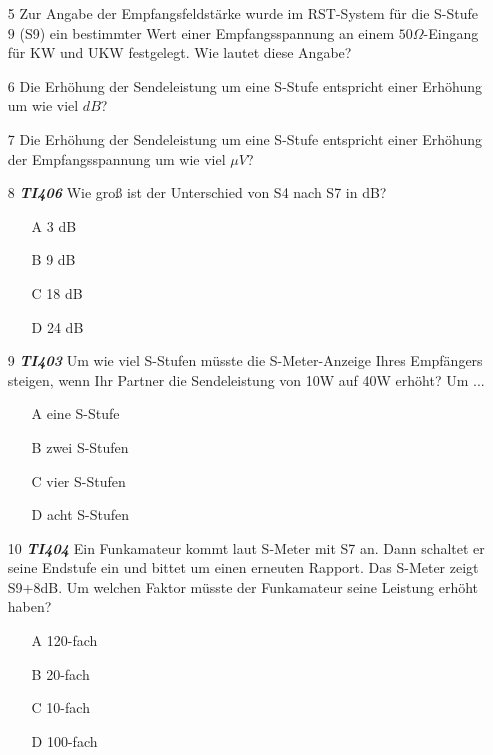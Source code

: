\begin{enumerate} 
\itemsep1pt\parskip0pt
\item[5] Zur Angabe der Empfangsfeldstärke wurde im RST-System für die S-Stufe $9$ (S9) ein bestimmter Wert einer Empfangsspannung an einem $50\Omega$-Eingang für KW und UKW festgelegt. Wie lautet diese Angabe?
\item[6] Die Erhöhung der Sendeleistung um eine S-Stufe entspricht einer Erhöhung um wie viel $dB$?
\item[7] Die Erhöhung der Sendeleistung um eine S-Stufe entspricht einer Erhöhung der Empfangsspannung um wie viel $\mu V$? 
\item[8] \emph{\textbf{TI406}} Wie groß ist der Unterschied von S4 nach S7 in dB?
	\begin{enumerate}
	\itemsep1pt\parskip0pt
		\item[A] 3 dB
		\item[B] 9 dB
		\item[C] 18 dB
		\item[D] 24 dB
	\end{enumerate}
\item[9] \emph{\textbf{TI403}} Um wie viel S-Stufen müsste die S-Meter-Anzeige Ihres Empfängers steigen, wenn Ihr Partner die Sendeleistung von 10W auf 40W erhöht? Um ...
	\begin{enumerate}
	\itemsep1pt\parskip0pt
		\item[A] eine S-Stufe
		\item[B] zwei S-Stufen
		\item[C] vier S-Stufen
		\item[D] acht S-Stufen
	\end{enumerate}
\item[10] \emph{\textbf{TI404}} Ein Funkamateur kommt laut S-Meter mit S7 an. Dann schaltet er seine Endstufe ein und bittet um einen erneuten Rapport. Das S-Meter zeigt S9+8dB. Um welchen Faktor müsste der Funkamateur seine Leistung erhöht haben?
	\begin{enumerate}
	\itemsep1pt\parskip0pt
		\item[A] 120-fach
		\item[B] 20-fach 
		\item[C] 10-fach
		\item[D] 100-fach
	\end{enumerate}
\end{enumerate}

